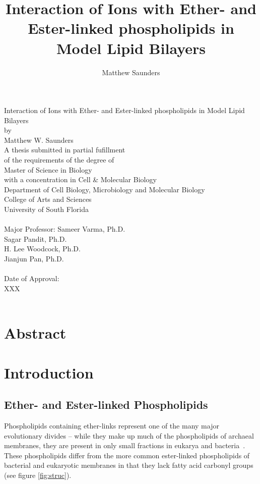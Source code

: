 \documentclass[12pt,preprint,times,openany,draft]{book}
\author{Matthew Saunders}
\title{Interaction of Ions with Ether- and Ester-linked phospholipids in Model Lipid Bilayers}
\begin{document}
\pagestyle{plain}
\begin{titlepage}
\begin{centering}
Interaction of Ions with Ether- and Ester-linked phospholipids in Model Lipid Bilayers
~\\[3\baselineskip]
by
~\\[3\baselineskip]
Matthew W. Saunders
~\\[4\baselineskip]
A thesis submitted in partial fufillment\\
of the requirements of the degree of\\
Master of Science in Biology \\ with a concentration in Cell \& Molecular Biology\\
Department of Cell Biology, Microbiology and Molecular Biology\\
College of Arts and Sciences\\
University of South Florida\\
~\\[2\baselineskip]
Major Professor: Sameer Varma, Ph.D.\\
Sagar Pandit, Ph.D.\\
H. Lee Woodcock, Ph.D.\\
Jianjun Pan, Ph.D.\\
~\\[2\baselineskip]
Date of Approval:\\
XXX\\
~\\[3\baselineskip]
\end{centering}
\end{titlepage}
\tableofcontents
{}
\listoftables
\listoffigures

\doublespacing
\chapter*{Abstract}
\lipsum[1-5]
\chapter{Introduction}
\section{Ether- and Ester-linked Phospholipids}
Phospholipids containing ether-links represent one of the many major evolutionary divides -- while they make up much of the phospholipids of archaeal membranes,
 they are present in only small fractions in eukarya and bacteria~\cite{sehgal:1962, koga:2014}. 
These phospholipids differ from the more common ester-linked phospholipids of bacterial and 
eukaryotic membranes in that they lack fatty acid carbonyl groups (see figure \ref{fig:struc}). 
\end{document}
